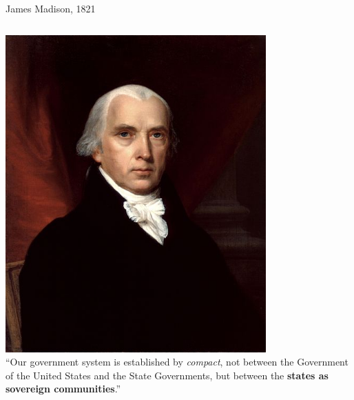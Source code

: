 \begin{frame}{James Madison, 1821}
    \begin{columns}[c]
            \centering
            \includegraphics[width=0.75\textwidth]{img/madison.jpg} \\
            ``Our government system is established by \emph{compact}, not between the Government of the United States and the State Governments, but between the \textbf{states as sovereign communities}.''
    \end{columns}
\end{frame}

